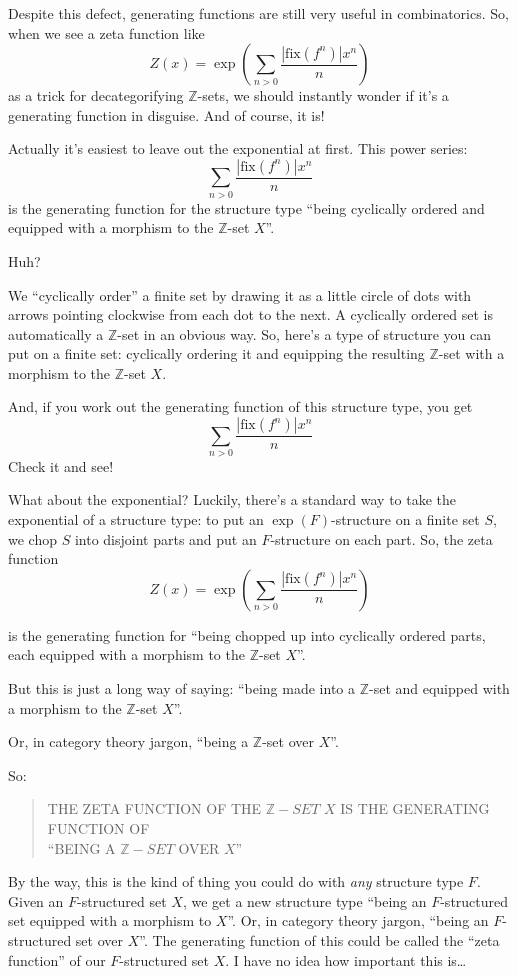 \documentclass{article}
\begin{document}
Despite this defect, generating functions are still very useful in
combinatorics. So, when we see a zeta function like
\[Z(x) = \exp\left(\sum_{n>0} \frac{|\mathrm{fix}(f^n)| x^n}{n}\right)\]
as a trick for decategorifying \(\mathbb{Z}\)-sets, we should instantly
wonder if it's a generating function in disguise. And of course, it is!

Actually it's easiest to leave out the exponential at first. This power
series: \[\sum_{n>0} \frac{|\mathrm{fix}(f^n)| x^n}{n}\] is the
generating function for the structure type ``being cyclically ordered
and equipped with a morphism to the \(\mathbb{Z}\)-set \(X\)''.

Huh?

We ``cyclically order'' a finite set by drawing it as a little circle of
dots with arrows pointing clockwise from each dot to the next. A
cyclically ordered set is automatically a \(\mathbb{Z}\)-set in an
obvious way. So, here's a type of structure you can put on a finite set:
cyclically ordering it and equipping the resulting \(\mathbb{Z}\)-set
with a morphism to the \(\mathbb{Z}\)-set \(X\).

And, if you work out the generating function of this structure type, you
get \[\sum_{n>0} \frac{|\mathrm{fix}(f^n)| x^n}{n}\] Check it and see!

What about the exponential? Luckily, there's a standard way to take the
exponential of a structure type: to put an \(\exp(F)\)-structure on a
finite set \(S\), we chop \(S\) into disjoint parts and put an
\(F\)-structure on each part. So, the zeta function
\[Z(x) = \exp\left(\sum_{n>0} \frac{|\mathrm{fix}(f^n)| x^n}{n}\right)\]

is the generating function for ``being chopped up into cyclically
ordered parts, each equipped with a morphism to the \(\mathbb{Z}\)-set
\(X\)''.

But this is just a long way of saying: ``being made into a
\(\mathbb{Z}\)-set and equipped with a morphism to the
\(\mathbb{Z}\)-set \(X\)''.

Or, in category theory jargon, ``being a \(\mathbb{Z}\)-set over
\(X\)''.

So:

\begin{quote}
THE ZETA FUNCTION OF THE \(\mathbb{Z}-SET\) \(X\) IS THE GENERATING
FUNCTION OF\\
``BEING A \(\mathbb{Z}-SET\) OVER \(X\)''
\end{quote}

By the way, this is the kind of thing you could do with \emph{any}
structure type \(F\). Given an \(F\)-structured set \(X\), we get a new
structure type ``being an \(F\)-structured set equipped with a morphism
to \(X\)''. Or, in category theory jargon, ``being an \(F\)-structured
set over \(X\)''. The generating function of this could be called the
``zeta function'' of our \(F\)-structured set \(X\). I have no idea how
important this is\ldots{}
\end{document}
